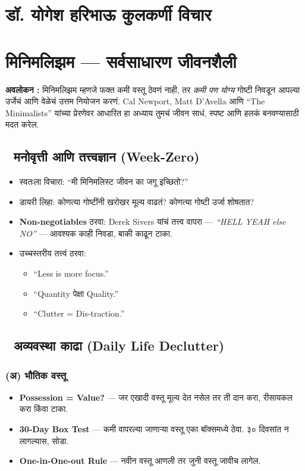 \chapter*{डॉ. योगेश हरिभाऊ कुलकर्णी  विचार }


\chapter{मिनिमलिझम — सर्वसाधारण जीवनशैली}

\textbf{अवलोकन :}  
मिनिमलिझम म्हणजे फक्त कमी वस्तू ठेवणं नाही, तर \textit{कमी पण योग्य} गोष्टी निवडून आपल्या उर्जेचं आणि वेळेचं उत्तम नियोजन करणं. Cal Newport, Matt D’Avella आणि “The Minimalists” यांच्या प्रेरणेवर आधारित हा अध्याय तुमचं जीवन साधं, स्पष्ट आणि हलकं बनवण्यासाठी मदत करेल.  

\section*{🌱 मनोवृत्ती आणि तत्त्वज्ञान (Week-Zero)}

\begin{itemize}
  \item स्वतःला विचारा: “मी मिनिमलिस्ट जीवन का जगू इच्छितो?”  
  \item डायरी लिहा: कोणत्या गोष्टींनी खरोखर मूल्य वाढतं? कोणत्या गोष्टी उर्जा शोषतात?  
  \item \textbf{Non-negotiables} ठरवा: Derek Sivers यांचं तत्त्व वापरा — \textit{“HELL YEAH else NO”} — आवश्यक काही निवडा, बाकी काढून टाका.  
  \item उच्चस्तरीय तत्त्वं ठरवा:  
  \begin{itemize}
    \item “Less is more focus.”  
    \item “Quantity पेक्षा Quality.”  
    \item “Clutter = Dis-traction.”  
  \end{itemize}
\end{itemize}

\section*{🧹 अव्यवस्था काढा (Daily Life Declutter)}

\subsection*{(अ) भौतिक वस्तू}
\begin{itemize}
  \item \textbf{Possession = Value?} — जर एखादी वस्तू मूल्य देत नसेल तर ती दान करा, रीसायकल करा किंवा टाका.  
  \item \textbf{30-Day Box Test} — कमी वापरल्या जाणाऱ्या वस्तू एका बॉक्समध्ये ठेवा. ३० दिवसांत न लागल्यास, सोडा.  
  \item \textbf{One-in-One-out Rule} — नवीन वस्तू आणली तर जुनी वस्तू जावीच लागेल.  
\end{itemize}

